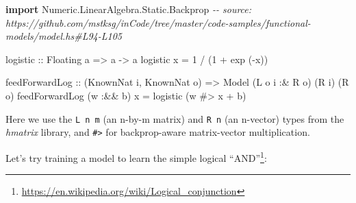 \documentclass[]{article}
\newenvironment{Shaded}{}{}
\newcommand{\CommentTok}[1]{\textcolor[rgb]{0.38,0.63,0.69}{\textit{#1}}}
\newcommand{\DataTypeTok}[1]{\textcolor[rgb]{0.56,0.13,0.00}{#1}}
\newcommand{\DecValTok}[1]{\textcolor[rgb]{0.25,0.63,0.44}{#1}}
\newcommand{\FunctionTok}[1]{\textcolor[rgb]{0.02,0.16,0.49}{#1}}
\newcommand{\KeywordTok}[1]{\textcolor[rgb]{0.00,0.44,0.13}{\textbf{#1}}}
\newcommand{\NormalTok}[1]{#1}
\newcommand{\OperatorTok}[1]{\textcolor[rgb]{0.40,0.40,0.40}{#1}}
\newcommand{\OtherTok}[1]{\textcolor[rgb]{0.00,0.44,0.13}{#1}}
\renewcommand{\href}[2]{#2\footnote{\url{#1}}}
\begin{document}
\begin{Shaded}
\begin{Highlighting}[]
\KeywordTok{import} \DataTypeTok{Numeric.LinearAlgebra.Static.Backprop}
\CommentTok{{-}{-} source: https://github.com/mstksg/inCode/tree/master/code{-}samples/functional{-}models/model.hs\#L94{-}L105}

\OtherTok{logistic ::} \DataTypeTok{Floating}\NormalTok{ a }\OtherTok{=\textgreater{}}\NormalTok{ a }\OtherTok{{-}\textgreater{}}\NormalTok{ a}
\NormalTok{logistic x }\OtherTok{=} \DecValTok{1} \OperatorTok{/}\NormalTok{ (}\DecValTok{1} \OperatorTok{+} \FunctionTok{exp}\NormalTok{ (}\OperatorTok{{-}}\NormalTok{x))}

\NormalTok{feedForwardLog}
\OtherTok{    ::}\NormalTok{ (}\DataTypeTok{KnownNat}\NormalTok{ i, }\DataTypeTok{KnownNat}\NormalTok{ o)}
    \OtherTok{=\textgreater{}} \DataTypeTok{Model}\NormalTok{ (}\DataTypeTok{L}\NormalTok{ o i }\OperatorTok{:\&} \DataTypeTok{R}\NormalTok{ o) (}\DataTypeTok{R}\NormalTok{ i) (}\DataTypeTok{R}\NormalTok{ o)}
\NormalTok{feedForwardLog (w }\OperatorTok{:\&\&}\NormalTok{ b) x }\OtherTok{=}\NormalTok{ logistic (w }\OperatorTok{\#\textgreater{}}\NormalTok{ x }\OperatorTok{+}\NormalTok{ b)}
\end{Highlighting}
\end{Shaded}

Here we use the \texttt{L\ n\ m} (an n-by-m matrix) and \texttt{R\ n} (an
n-vector) types from the \emph{hmatrix} library, and \texttt{\#\textgreater{}}
for backprop-aware matrix-vector multiplication.

Let's try training a model to learn the simple
\href{https://en.wikipedia.org/wiki/Logical_conjunction}{logical ``AND''}:

\begin{Shaded}
\end{Shaded}
\end{document}
